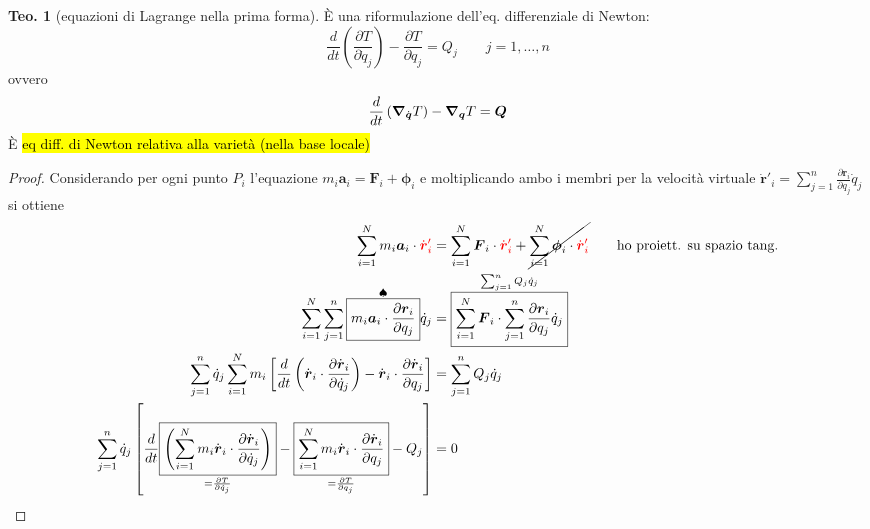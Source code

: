 \documentclass[a4paper,10pt]{article}
\theoremstyle{definition}
\newcommand{\bv}{\boldsymbol} %
\theoremstyle{indentdefinition}
\theoremstyle{indenttheorem}
\newtheorem{thm}{Teo.}
\theoremstyle{myremark}
\theoremstyle{indentgeneral}
\newenvironment{myboxed} 
{\noindent\begin{lrbox}{\mybox}\begin{minipage}{\textwidth}}
{\end{minipage}\end{lrbox}\fbox{\usebox{\mybox}}}
\begin{document}
\begin{myboxed}
\begin{thm}[equazioni di Lagrange nella prima forma] È una riformulazione dell'eq. differenziale di Newton:
\label{thm:prima-forma-Lagrange}
\[
\frac{d}{dt}\left(\frac{\partial T}{\partial\dot{q}_{j}}\right)-\frac{\partial T}{\partial q_{j}}=Q_{j} \quad\quad j=1,\dots, n
\]
ovvero
$$\frac{d}{dt}\left(\grad_{\dot{\bv{q}}}T\right)-\grad_{\bv{q}}T=\bv{Q}$$
È \hl{eq diff. di Newton relativa alla varietà (nella base locale)}
\end{thm}
\end{myboxed}

\begin{proof}
Considerando per ogni punto $P_{i}$ l'equazione $m_{i}\boldsymbol{a}_{i}=\boldsymbol{F}_{i}+\boldsymbol{\phi}_{i}$
e moltiplicando ambo i membri per la velocità virtuale $\dot{\bv{r}}'_i=\sum_{j=1}^{n}\frac{\partial\boldsymbol{r}_{i}}{\partial q_{j}}\dot{q}_{j}$
si ottiene
\begin{align*}
\sum_{i=1}^{N}m_{i}\boldsymbol{a}_{i}\cdot\textcolor{red}{\dot{\bv{r}}'_i}&=\sum_{i=1}^{N}\boldsymbol{F}_{i}\cdot\textcolor{red}{\dot{\bv{r}}'_i}+\cancel{\sum_{i=1}^{N}\boldsymbol{\phi}_{i}\cdot\textcolor{red}{\dot{\bv{r}}'_i}} \qquad \text{ho proiett. su spazio tang.}\\
\sum_{i=1}^{N}\sum_{j=1}^{n}\overset{\spadesuit}{\boxed{m_{i}\boldsymbol{a}_{i}\cdot\frac{\partial\boldsymbol{r}_{i}}{\partial q_{j}}}}\dot{q}_{j}&=\overset{\sum_{j=1}^{n}Q_{j}\dot{q}_{j}}{\boxed{\sum_{i=1}^{N}\boldsymbol{F}_{i}\cdot\sum_{j=1}^{n}\frac{\partial\boldsymbol{r}_{i}}{\partial q_{j}}\dot{q}_{j}}} \\
\sum_{j=1}^{n}\dot{q}_{j}\sum_{i=1}^{N}m_{i}\left[\frac{d}{dt}\left(\dot{\bv{r}}_i\cdot\frac{\partial\dot{\bv{r}}_i}{\partial\dot{q}_{j}}\right)-\dot{\bv{r}}_i\cdot\frac{\partial\dot{\bv{r}}_i}{\partial q_{j}}\right]&=\sum_{j=1}^{n}Q_{j}\dot{q}_{j} \\
\sum_{j=1}^{n}\dot{q}_{j}\left[\frac{d}{dt}\underset{=\frac{\partial T}{\partial \dot{q}_j}}{\boxed{\left(\sum_{i=1}^{N}m_{i}\dot{\bv{r}}_i\cdot\frac{\partial\dot{\bv{r}}_i}{\partial\dot{q}_{j}}\right)}}-\underset{=\frac{\partial T}{\partial {q}_j}}{\boxed{\sum_{i=1}^{N}m_{i}\dot{\bv{r}}_i\cdot\frac{\partial\dot{\bv{r}}_i}{\partial q_{j}}}}-Q_{j}\right]&=0
\end{align*}


\end{proof}
\end{document}
